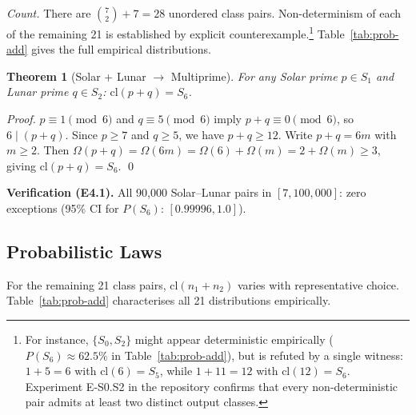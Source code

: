 \documentclass[10pt,twocolumn]{article}
\newtheorem{theorem}{Theorem}[section]
\newcommand{\cl}{\mathrm{cl}}
\newcommand{\Om}{\Omega}
\begin{document}
\emph{Count.} There are $\binom{7}{2}+7=28$ unordered class pairs.
Non-determinism of each of the remaining 21 is established by explicit
counterexample.\footnote{For instance, $\{S_0, S_2\}$ might appear
deterministic empirically ($P(S_6) \approx 62.5\%$ in Table~\ref{tab:prob-add}), but is
refuted by a single witness: $1 + 5 = 6$ with $\cl(6) = S_5$, while
$1 + 11 = 12$ with $\cl(12) = S_6$. Experiment E-S0.S2 in the
repository confirms that every non-deterministic pair admits at least
two distinct output classes.}
Table~\ref{tab:prob-add} gives the full empirical distributions.

\begin{theorem}[Solar + Lunar $\to$ Multiprime]
\label{thm:solar-lunar}
For any Solar prime $p \in S_1$ and Lunar prime $q \in S_2$:
$\cl(p + q) = S_6$.
\end{theorem}
\begin{proof}
$p \equiv 1 \pmod{6}$ and $q \equiv 5 \pmod{6}$ imply
$p + q \equiv 0 \pmod{6}$, so $6 \mid (p+q)$.
Since $p \geq 7$ and $q \geq 5$, we have $p+q \geq 12$.
Write $p+q = 6m$ with $m \geq 2$. Then
$\Om(p+q) = \Om(6m) = \Om(6)+\Om(m) = 2 + \Om(m) \geq 3$,
giving $\cl(p+q) = S_6$. \qed
\end{proof}

\noindent\textbf{Verification (E4.1).} All 90{,}000 Solar--Lunar pairs
in $[7, 100{,}000]$: zero exceptions (95\% CI for $P(S_6)$:
$[0.99996, 1.0]$).

\subsection{Probabilistic Laws}

For the remaining 21 class pairs, $\cl(n_1 + n_2)$ varies with
representative choice. Table~\ref{tab:prob-add} characterises all 21 distributions
empirically.
\end{document}
